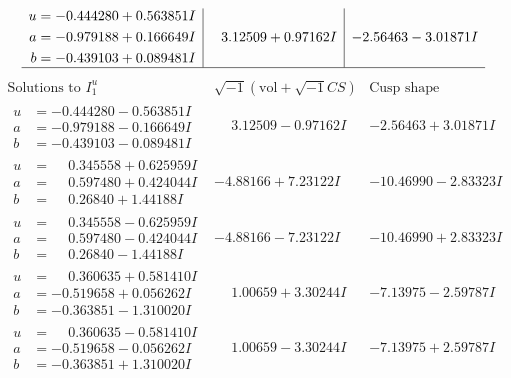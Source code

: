 \documentclass[1p]{elsarticle_modified}
\theoremstyle{definition}
\newcommand{\I}{\sqrt{-1}}
\begin{document}
$$\begin{array}{c|c|c}
\begin{aligned}
u &= -0.444280 + 0.563851 I \\
a &= -0.979188 + 0.166649 I \\
b &= -0.439103 + 0.089481 I\end{aligned}
 & \phantom{-}3.12509 + 0.97162 I & -2.56463 - 3.01871 I\\
 \hline 
 \end{array}$$\newpage$$\begin{array}{c|c|c}  
\text{Solutions to }I^u_{1}& \I (\text{vol} + \sqrt{-1}CS) & \text{Cusp shape}\\
 \hline 
\begin{aligned}
u &= -0.444280 - 0.563851 I \\
a &= -0.979188 - 0.166649 I \\
b &= -0.439103 - 0.089481 I\end{aligned}
 & \phantom{-}3.12509 - 0.97162 I & -2.56463 + 3.01871 I \\ \hline\begin{aligned}
u &= \phantom{-}0.345558 + 0.625959 I \\
a &= \phantom{-}0.597480 + 0.424044 I \\
b &= \phantom{-}0.26840 + 1.44188 I\end{aligned}
 & -4.88166 + 7.23122 I & -10.46990 - 2.83323 I \\ \hline\begin{aligned}
u &= \phantom{-}0.345558 - 0.625959 I \\
a &= \phantom{-}0.597480 - 0.424044 I \\
b &= \phantom{-}0.26840 - 1.44188 I\end{aligned}
 & -4.88166 - 7.23122 I & -10.46990 + 2.83323 I \\ \hline\begin{aligned}
u &= \phantom{-}0.360635 + 0.581410 I \\
a &= -0.519658 + 0.056262 I \\
b &= -0.363851 - 1.310020 I\end{aligned}
 & \phantom{-}1.00659 + 3.30244 I & -7.13975 - 2.59787 I \\ \hline\begin{aligned}
u &= \phantom{-}0.360635 - 0.581410 I \\
a &= -0.519658 - 0.056262 I \\
b &= -0.363851 + 1.310020 I\end{aligned}
 & \phantom{-}1.00659 - 3.30244 I & -7.13975 + 2.59787 I \\ \hline\begin{aligned}

\end{aligned}
\end{array}$$
\end{document}
